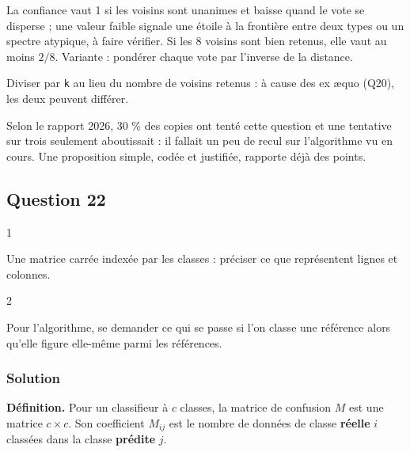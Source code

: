 \documentclass[11pt,a4paper]{article}
\begin{document}
La confiance vaut 1 si les voisins sont unanimes et baisse quand le vote se disperse ; une valeur faible signale une étoile à la frontière entre deux types ou un spectre atypique, à faire vérifier. Si les 8 voisins sont bien retenus, elle vaut au moins \(2/8\). Variante : pondérer chaque vote par l'inverse de la distance.

\begin{piege}

Diviser par \texttt{k} au lieu du nombre de voisins retenus : à cause des ex æquo (Q20), les deux peuvent différer.

\end{piege}

\begin{jury}

Selon le rapport 2026, 30 \% des copies ont tenté cette question et une tentative sur trois seulement aboutissait : il fallait un peu de recul sur l'algorithme vu en cours. Une proposition simple, codée et justifiée, rapporte déjà des points.

\end{jury}

\hypertarget{question-22}{%
\subsection{Question 22}\label{question-22}}

\begin{indication}{1}

Une matrice carrée indexée par les classes : préciser ce que représentent lignes et colonnes.

\end{indication}

\begin{indication}{2}

Pour l'algorithme, se demander ce qui se passe si l'on classe une référence alors qu'elle figure elle-même parmi les références.

\end{indication}

\hypertarget{solution-21}{%
\subsubsection{Solution}\label{solution-21}}

\textbf{Définition.} Pour un classifieur à \(c\) classes, la matrice de confusion \(M\) est une matrice \(c \times c\). Son coefficient \(M_{ij}\) est le nombre de données de classe \textbf{réelle} \(i\) classées dans la classe \textbf{prédite} \(j\).
\end{document}
